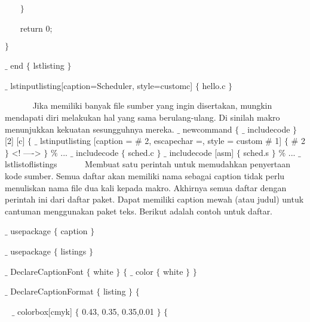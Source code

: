 {\fontsize{10pt}{10pt}\selectfont ~~~  $ \} $ }\par

{\fontsize{10pt}{10pt}\selectfont ~~~ return 0;}\par

{\fontsize{10pt}{10pt}\selectfont  $ \} $ }\par

{\fontsize{10pt}{10pt}\selectfont  $ \_ $ end $ \{ $ lstlisting $ \} $ }\par

{\fontsize{10pt}{10pt}\selectfont  $ \_ $ lstinputlisting[caption=Scheduler, style=customc] $ \{ $ hello.c $ \} $ }\par


\noindent ~~~~~~ Jika memiliki banyak file sumber yang ingin disertakan, mungkin mendapati diri melakukan hal yang sama berulang-ulang. Di sinilah makro menunjukkan kekuatan sesungguhnya mereka. $ \_ $  newcommand  $ \{ $  $ \_ $  includecode $ \} $  [2] [c]  $ \{ $  $ \_ $  lstinputlisting [caption =  $\#$  2, escapechar =, style = custom  $\#$  1]  $ \{ $  $\#$  2 $ \} $  <! ----> $ \} $  $\%$  ... $ \_ $  includecode  $ \{ $ sched.c $ \} $  $ \_ $  includecode [asm]  $ \{ $ sched.s $ \} $  $\%$  ... $ \_ $  lstlistoflistings~~~~~~ Membuat satu perintah untuk memudahkan penyertaan kode sumber. Semua daftar akan memiliki nama  sebagai caption tidak perlu menuliskan nama file dua kali kepada makro. Akhirnya semua daftar dengan perintah ini dari daftar paket. Dapat memiliki caption mewah (atau judul) untuk cantuman menggunakan paket teks. Berikut adalah contoh untuk daftar.\par

{\fontsize{10pt}{10pt}\selectfont  $ \_ $ usepackage $ \{ $ caption $ \} $ }\par

{\fontsize{10pt}{10pt}\selectfont  $ \_ $ usepackage $ \{ $ listings $ \} $ }\par

{\fontsize{10pt}{10pt}\selectfont  $ \_ $ DeclareCaptionFont $ \{ $ white $ \} $  $ \{ $   $ \_ $ color $ \{ $ white $ \} $   $ \} $ }\par

{\fontsize{10pt}{10pt}\selectfont  $ \_ $ DeclareCaptionFormat $ \{ $ listing $ \} $  $ \{ $ }\par

{\fontsize{10pt}{10pt}\selectfont ~  $ \_ $ colorbox[cmyk] $ \{ $ 0.43, 0.35, 0.35,0.01  $ \} $  $ \{ $ }\par

